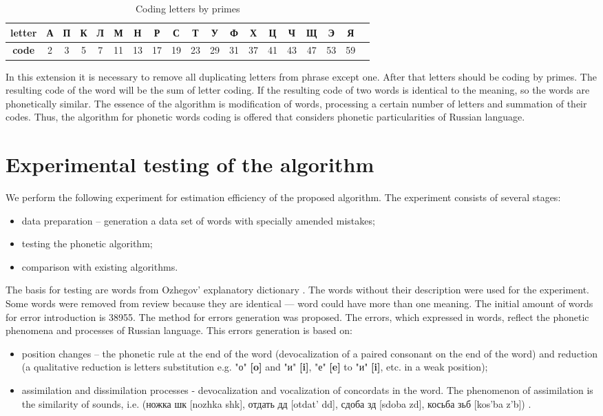 \documentclass[conference,a4paper]{IEEEtran}
\begin{document}
\begin{table*}[t!]
	\caption{Coding letters by primes}
    \label{lbl-primes}
    \centering
    \begin{tabular}{|c*{18}{|c}|}
    \hline
    \textbf{letter} & А & П & К & Л & М & Н & Р & С & Т & У & Ф &  Х & Ц & Ч & Щ & Э & Я \\
    \hline
    \textbf{code} & 2 & 3 &	5 &	7 &	11 & 13 & 17 & 19 &	23 & 29 & 31 &	37 & 41 & 43 & 47 & 53 & 59 \\
    \hline
    \end{tabular}
\end{table*}

In this extension it is necessary to remove all duplicating letters from phrase except one. After that letters should be coding by primes. The resulting code of the word will be the sum of letter coding. If the resulting code of two words is identical to the meaning, so the words are phonetically similar.
The essence of the algorithm is modification of words, processing a certain number of letters and summation of their codes.
Thus, the algorithm for phonetic words coding is offered that considers phonetic particularities of Russian language. 

\section{Experimental testing of the algorithm}
We perform the following experiment for estimation efficiency of the proposed algorithm. The experiment consists of several stages:
\begin{itemize}
\item data preparation -- generation a data set of words with specially amended mistakes;
\item testing the phonetic algorithm;
\item comparison with existing algorithms.
\end{itemize}

The basis for testing are words from Ozhegov’ explanatory dictionary \cite{Ozhegov-2007}. The words without their description were used for the experiment. Some words were removed from review because they are identical --- word could have more than one meaning. The initial amount of words for error introduction is 38955.
The method for errors generation was proposed. The errors, which expressed in words, reflect the phonetic phenomena and processes of Russian language. This errors generation is based on:
\begin{itemize}
\item position changes – the phonetic rule at the end of the word (devocalization of a paired consonant on the end of the word) and reduction (a qualitative reduction is letters substitution e.g. "о" \textbf{[o]} and "и" \textbf{[i]}, "е" \textbf{[e]} to "и" \textbf{[i]}, etc. in a weak position);
\item assimilation and dissimilation processes - devocalization and vocalization of concordats in the word. The phenomenon of assimilation is the similarity of sounds, i.e. (ножка {шк} [nozhka {shk}], отдать {дд} [otdat’ {dd}], сдоба {зд} [sdoba {zd}], косьба {зьб} [kos’ba {z’b}]) \cite{Kastkin-1999}.
\end{itemize}
\end{document}
